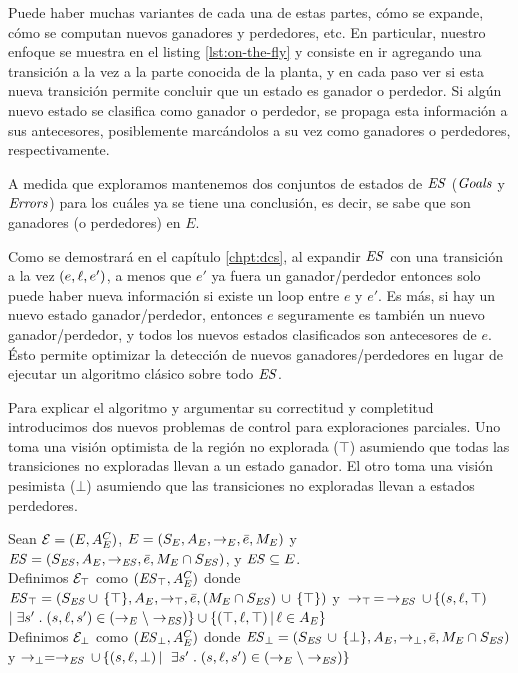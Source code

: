 Puede haber muchas variantes de cada una de estas partes, cómo se expande, cómo se computan nuevos ganadores y perdedores, etc. En particular, nuestro enfoque se muestra en el listing \ref{lst:on-the-fly} y consiste en ir agregando una transición a la vez a la parte conocida de la planta, y en cada paso ver si esta nueva transición permite concluir que un estado es ganador o perdedor. Si algún nuevo estado se clasifica como ganador  o perdedor, se propaga esta información a sus antecesores, posiblemente marcándolos a su vez como ganadores o perdedores, respectivamente.

A medida que exploramos mantenemos dos conjuntos de estados de $\mathit{ES}$ ($\mathit{Goals}$ y $\mathit{Errors}$) para los cuáles ya se tiene una conclusión, es decir, se sabe que son ganadores (o perdedores) en $E$.

Como se demostrará en el capítulo \ref{chpt:dcs}, al expandir $\mathit{ES}$ con una transición a la vez $(e,\ell,e')$, a menos que $e'$ ya fuera un ganador/perdedor entonces solo puede haber nueva información si existe un loop entre $e$ y $e'$. Es más, si hay un nuevo estado ganador/perdedor, entonces $e$ seguramente es también un nuevo ganador/perdedor, y todos los nuevos estados clasificados son antecesores de $e$. Ésto permite optimizar la detección de nuevos ganadores/perdedores en lugar de ejecutar un algoritmo clásico sobre todo $\mathit{ES}$.




Para explicar el algoritmo y argumentar su correctitud y completitud introducimos dos nuevos problemas de control para exploraciones parciales. Uno toma una visión optimista de la región no explorada ($\top$) asumiendo que todas las transiciones no exploradas llevan a un estado ganador. El otro toma una visión pesimista ($\bot$) asumiendo que las transiciones no exploradas llevan a estados perdedores.

\begin{definition}
	 \label{def:unexploredTo}
	
	Sean $\mathcal{E} = (E, A_E^C)$, $E = (S_E,A_E,\rightarrow_E,\bar{e},M_E)$ y $\mathit{ES} = 
	(S_{\mathit{ES}},A_E, \rightarrow_{\mathit{ES}},\bar{e},M_E \cap S_{\mathit{ES}})$, y $\mathit{ES} 
	\subseteq E$.
	\\
	Definimos $\mathcal{E}_\top$ como $(\mathit{{\mathit{ES}}_{\top}}, A_E^C)$ donde 
	$\mathit{{\mathit{ES}}_{\top}} = (S_{\mathit{ES}} \cup \, \{\top\},A_E,\rightarrow_\top, 
	\bar{e}, 
	(M_E \cap S_{\mathit{ES}})\, \cup \, \{\top\})$ y $\, \rightarrow_\top \, = \, \rightarrow_{\mathit{ES}} 
	\, 
	\cup\, \{(s,\ell, \top) 
	\;$ $ | \; \exists s' \;.\; (s, \ell, s') \in (\rightarrow_E \setminus \rightarrow_{\mathit{ES}})\} \cup \{(\top, \ell, \top) \, | \, \ell \in A_E\}$ \\
	Definimos $\mathcal{E}_\bot$ como $(\mathit{{\mathit{ES}}_{\bot}}, A_E^C)$ donde 
	$\mathit{{\mathit{ES}}_{\bot}} = (S_{\mathit{ES}} \, \cup \, 
	\{\bot\},A_E,\rightarrow_\bot, 
	\bar{e}, M_E \cap S_{\mathit{ES}})$ y $\rightarrow_\bot = \rightarrow_{\mathit{ES}} \, \cup \, \{(s,\ell, 
	\bot) \, | \, $ $ \exists s' \;.\; (s, \ell, s') \in (\rightarrow_E \setminus \rightarrow_{\mathit{ES}})\}$ 
\end{definition}

